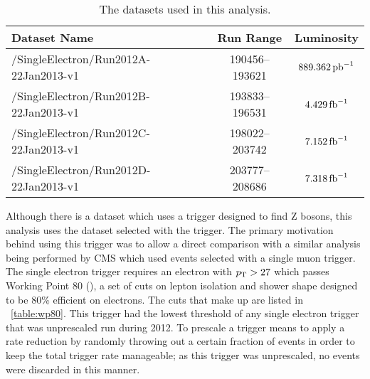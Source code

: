 \begin{table}[h]
\centering
\begin{center}
    \begin{tabular}{ | l | c | c |}
    \hline
	Dataset Name                          & Run Range      & Luminosity       \\ \hline
	/SingleElectron/Run2012A-22Jan2013-v1 & 190456--193621 & $889.362 \mbox{\ensuremath{\,\text{pb}^\text{$-$1}}}$ \\ \hline
	/SingleElectron/Run2012B-22Jan2013-v1 & 193833--196531 & $4.429 \mbox{\ensuremath{\,\text{fb}^\text{$-$1}}}$   \\ \hline
	/SingleElectron/Run2012C-22Jan2013-v1 & 198022--203742 & $7.152 \mbox{\ensuremath{\,\text{fb}^\text{$-$1}}}$   \\ \hline
	/SingleElectron/Run2012D-22Jan2013-v1 & 203777--208686 & $7.318 \mbox{\ensuremath{\,\text{fb}^\text{$-$1}}}$   \\ \hline
    \end{tabular}
\end{center}
\caption{
    The datasets used in this analysis.
}
\label{table:datasets}
\end{table}

Although there is a \DoubleElectron dataset which uses a trigger designed to
find Z bosons, this analysis uses the \SingleElectron dataset selected with the
\SingleElectronTrigger trigger. The primary motivation behind using this
trigger was to allow a direct comparison with a similar \phistar analysis being
performed by CMS which used \Ztomumu events selected with a single muon
trigger. The single electron trigger requires an electron with $p_{\mathrm{T}} > 27$ which
passes Working Point 80 (\WPEighty), a set of cuts on lepton isolation and
shower shape designed to be 80\% efficient on electrons. The cuts that make up
\WPEighty are listed in \TAB~\ref{table:wp80}. This trigger had the lowest \pt
threshold of any single electron trigger that was unprescaled run during 2012.
To prescale a trigger means to apply a rate reduction by randomly throwing out
a certain fraction of events in order to keep the total trigger rate
manageable; as this trigger was unprescaled, no events were discarded in this
manner.

